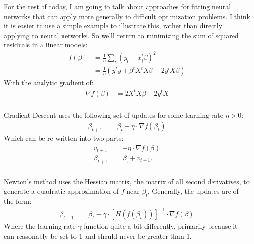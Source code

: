 \documentclass[xetex,mathserif,serif,aspectratio=169]{beamer}
\begin{document}
\begin{frame}[fragile] \frametitle{} \oldB \small

\textbf{}

For the rest of today, I am going to talk about approaches for fitting neural
networks that can apply more generally to difficult optimization problems.
I think it is easier to use a simple example to illustrate this, rather than
directly applying to neural networks. So we'll return to minimizing the sum
of squared residuals in a linear models:
\begin{align*}
f(\beta) &= \frac{1}{n} \sum_i (y_i - x_i^t \beta)^2 \\
&= \frac{1}{n} \left( y^t y + \beta^t X^tX \beta - 2 y^t X \beta \right)
\end{align*}
With the analytic gradient of:
\begin{align*}
\nabla f(\beta) &= 2 X^t X \beta - 2 y^t X
\end{align*}

\end{frame}

\begin{frame}[fragile] \frametitle{} \oldB \small

\textbf{}

Gradient Descent uses the following set of updates for
some learning rate $\eta > 0$:
\begin{align*}
\beta_{t+1} &= \beta_{t} - \eta \cdot \nabla f(\beta_t)
\end{align*}
Which can be re-written into two parts:
\begin{align*}
v_{t+1} &= - \eta \cdot \nabla f(\beta) \\
\beta_{t+1} &= \beta_{t} + v_{t+1}.
\end{align*}

\end{frame}


\begin{frame}[fragile] \frametitle{} \oldB \small

\textbf{}

Newton's method uses the Hessian matrix, the matrix of
all second derivatives, to generate a quadratic approximation
of $f$ near $\beta_{t}$. Generally, the updates are of the
form:
\begin{align*}
\beta_{t+1} &= \beta_{t} - \gamma \cdot [H(f(\beta_t))]^{-1} \cdot \nabla f(\beta)
\end{align*}
Where the learning rate $\gamma$ function quite a bit differently,
primarily because it can reasonably be set to $1$ and should never
be greater than 1.

\end{frame}
\end{document}
